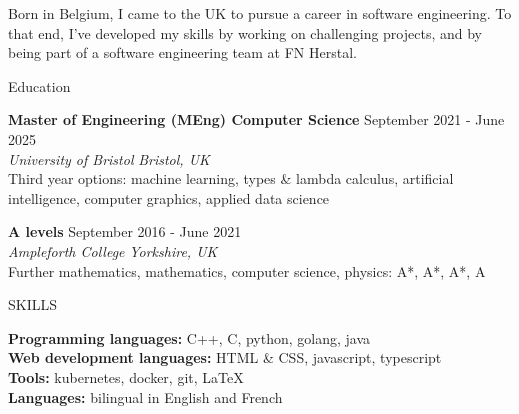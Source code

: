 \documentclass{resume} %
\begin{document}


{Born in Belgium, I came to the UK to pursue a career in software engineering. To that end, I've developed my skills by working on challenging projects, and by being part of a software engineering team at FN Herstal.}



\begin{rSection}{Education}

{\bf Master of Engineering (MEng) Computer Science} \hfill {September 2021 - June 2025} \\
\textit{University of Bristol} \hfill \textit{Bristol, UK} \\
Third year options: machine learning, types \& lambda calculus, artificial intelligence, computer graphics, applied data science

{\bf A levels} \hfill {September 2016 - June 2021} \\
\textit{Ampleforth College} \hfill \textit{Yorkshire, UK} \\
Further mathematics, mathematics, computer science, physics: A*, A*, A*, A

\end{rSection}

\begin{rSection}{SKILLS}

{\bf Programming languages:} C++, C, python, golang, java \\
{\bf Web development languages:} HTML \& CSS, javascript, typescript \\
{\bf Tools:} kubernetes, docker, git, LaTeX \\
{\bf Languages:} bilingual in English and French

\end{rSection}
\end{document}
